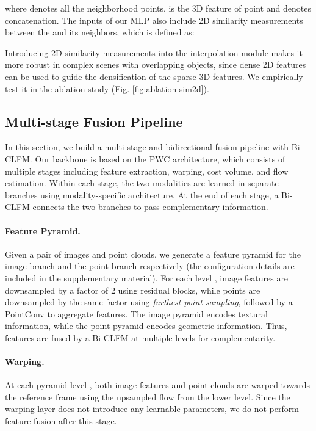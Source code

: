 \documentclass[10pt,twocolumn,letterpaper]{article}
\begin{document}
where  denotes all the neighborhood points,  is the 3D feature of point  and  denotes concatenation. The inputs of our MLP also include 2D similarity measurements between the  and its neighbors, which is defined as:


Introducing 2D similarity measurements into the interpolation module makes it more robust in complex scenes with overlapping objects, since dense 2D features can be used to guide the densification of the sparse 3D features. We empirically test it in the ablation study (Fig. \ref{fig:ablation-sim2d}).

\subsection{Multi-stage Fusion Pipeline}

In this section, we build a multi-stage and bidirectional fusion pipeline with Bi-CLFM. Our backbone is based on the PWC architecture, which consists of multiple stages including feature extraction, warping, cost volume, and flow estimation. Within each stage, the two modalities are learned in separate branches using modality-specific architecture. At the end of each stage, a Bi-CLFM connects the two branches to pass complementary information.

\vspace{-10pt}
\paragraph{Feature Pyramid.} Given a pair of images and point clouds, we generate a feature pyramid for the image branch and the point branch respectively (the configuration details are included in the supplementary material). For each level , image features are downsampled by a factor of 2 using residual blocks, while points are downsampled by the same factor using \textit{furthest point sampling}, followed by a PointConv \cite{wu2019pointconv} to aggregate features. The image pyramid encodes textural information, while the point pyramid encodes geometric information. Thus, features are fused by a Bi-CLFM at multiple levels for complementarity.

\vspace{-10pt}
\paragraph{Warping.} At each pyramid level , both image features and point clouds are warped towards the reference frame using the upsampled flow from the lower level. Since the warping layer does not introduce any learnable parameters, we do not perform feature fusion after this stage.
\end{document}
